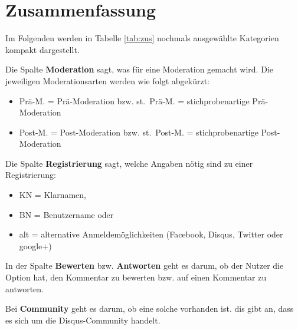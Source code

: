 \section{Zusammenfassung}

Im Folgenden werden in Tabelle \ref{tab:zus} nochmals ausgewählte Kategorien kompakt dargestellt.

Die Spalte {\bfseries Moderation} sagt, was für eine Moderation gemacht wird.
Die jeweiligen Moderationsarten werden wie folgt abgekürzt:
\begin{itemize}
  \item Prä-M. = Prä-Moderation bzw. st.~Prä-M. = stichprobenartige Prä-Moderation
  \item Post-M. = Post-Moderation bzw. st.~Post-M. = stichprobenartige Post-Moderation
\end{itemize}

Die Spalte {\bfseries Registrierung} sagt, welche Angaben nötig sind zu einer Registrierung:

\begin{itemize}
  \item KN = Klarnamen,
  \item BN = Benutzername oder
  \item alt = alternative Anmeldemöglichkeiten (Facebook, Disqus, Twitter oder google+)
\end{itemize}

In der Spalte {\bfseries Bewerten} bzw. {\bfseries Antworten} geht es darum, ob der Nutzer die Option hat, den Kommentar
zu bewerten bzw. auf einen Kommentar zu antworten.

Bei {\bfseries Community} geht es darum, ob eine solche vorhanden ist. dis gibt an, dass es sich um die Disqus-Community
handelt.



